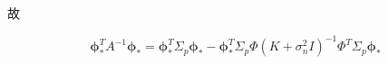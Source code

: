         故

        \begin{equation} \label{A5.34}
                \boldsymbol{\phi}_{*}^{T}A^{-1}\boldsymbol{\phi}_{*}=\boldsymbol{\phi}^{T}_{*}\Sigma_{p}\boldsymbol{\phi}_{*} -  \boldsymbol{\phi}^{T}_{*}\Sigma_{p}\boldsymbol{\varPhi}(K+\sigma^{2}_{n}I)^{-1} \boldsymbol{\varPhi}^{T}\Sigma_{p}\boldsymbol{\phi}_{*}
        \end{equation}